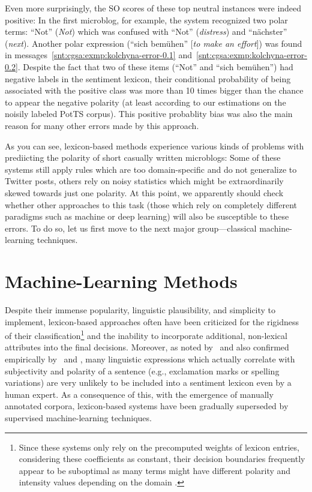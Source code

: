 \noindent Even more surprisingly, the SO scores of these top neutral
instances were indeed positive: In the first microblog, for example,
the system recognized two polar terms: ``Not'' (\emph{Not}) which was
confused with ``Not'' (\emph{distress}) and ``n\"achster''
(\emph{next}).  Another polar expression (``sich bem\"uhen'' [\emph{to
  make an effort}]) was found in
messages~\ref{snt:cgsa:exmp:kolchyna-error-0.1}
and~\ref{snt:cgsa:exmp:kolchyna-error-0.2}.  Despite the fact that two
of these items (``Not'' and ``sich bem\"uhen'') had negative labels in
the sentiment lexicon, their conditional probability of being
associated with the positive class was more than 10 times bigger than
the chance to appear the negative polarity (at least according to our
estimations on the noisily labeled PotTS corpus). This positive
probablity bias was also the main reason for many other errors made by
this approach.

As you can see, lexicon-based methods experience various kinds of
problems with prediicting the polarity of short casually written
microblogs: Some of these systems still apply rules which are too
domain-specific and do not generalize to Twitter posts, others rely on
noisy statistics which might be extraordinarily skewed towards just
one polarity.  At this point, we apparently should check whether other
approaches to this task (those which rely on completely different
paradigms such as machine or deep learning) will also be susceptible
to these errors.  To do so, let us first move to the next major
group---classical machine-learning techniques.

\section{Machine-Learning Methods}\label{sec:cgsa:ml-based}

Despite their immense popularity, linguistic plausibility, and
simplicity to implement, lexicon-based approaches often have been
criticized for the rigidness of their classification\footnote{Since
  these systems only rely on the precomputed weights of lexicon
  entries, considering these coefficients as constant, their decision
  boundaries frequently appear to be suboptimal as many terms might
  have different polarity and intensity values depending on the domain
  \cite[see][]{Eisenstein:17,Yang:17}.} and the inability to
incorporate additional, non-lexical attributes into the final
decisions.  Moreover, as noted by~\citet{Pang:02} and also confirmed
empirically by~\citet{Riloff:03} and \citet{Gamon:04}, many linguistic
expressions which actually correlate with subjectivity and polarity of
a sentence (e.g., exclamation marks or spelling variations) are very
unlikely to be included into a sentiment lexicon even by a human
expert.  As a consequence of this, with the emergence of manually
annotated corpora, lexicon-based systems have been gradually
superseded by supervised machine-learning techniques.

